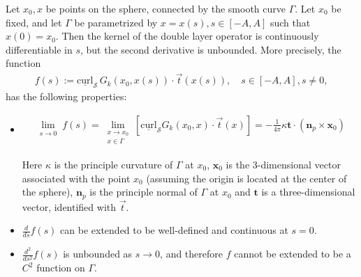 \documentclass[final]{siamltex}
\renewcommand{\S} {\mathcal{S}}
\begin{document}
\begin{lemma}
\label{regularity}
Let $x_0,x$ be points on the sphere, connected by the smooth curve
$\Gamma$. Let $x_0$ be fixed, and let $\Gamma$ be parametrized by
$x=x(s), s\in[-A,A]$ such that $x(0)=x_{0}$. Then the kernel of the
double layer operator is continuously differentiable in $s$, but the
second derivative is unbounded. More precisely, the function 
\begin{align*}
  f(s):=\underline{\mbox{curl}}_{\S}\,
    G_{k}(x_0,x(s))\cdot\vec{t}(x(s)), \quad s\in[-A,A], s \neq 0,
\end{align*}
has the following properties:
\begin{itemize}
\item 
\begin{align*} 
  \lim_{\substack {s \rightarrow 0}} f(s) = 
   \lim_{\substack {x \rightarrow x_{0} \\ x \in \Gamma}}
   [\underline{\mbox{curl}}_{\S}G_{k}(x_{0},x) \cdot \vec{t}(x)] =  
   -\frac{1}{4\pi} \kappa \mathbf{t}\cdot(\mathbf{n}_{p}
    \times \mathbf{x}_0)
\end{align*}

Here $\kappa$ is the principle curvature of $\Gamma$ at $x_{0}$,
$\mathbf{x}_0$ is the 3-dimensional vector associated with the point
$x_0$ (assuming the origin is located at the center of the sphere),
$\mathbf{n}_p$ is the principle normal of $\Gamma$ at $x_0$ and
$\mathbf{t}$ is a three-dimensional vector, identified with $\vec{t}$.
\item $\frac{d}{ds}f(s)$ can be extended to be well-defined and
continuous at $s=0$.
\item $\frac{d^2}{ds^2} f(s)$ is unbounded as $s\rightarrow 0$, and
therefore $f$ cannot be extended to be a $C^{2}$ function on $\Gamma$.
\end{itemize}
\end{lemma}
\end{document}
